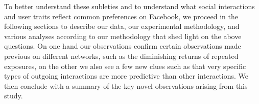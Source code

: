 To better understand these subleties and to understand what
social interactions and user traits reflect common preferences on
Facebook, we proceed in the following sections to describe our data,
our experimental methodology, and various analyses according to our
methodology that shed light on the above questions. 
On one hand our observations confirm certain observations made previous 
on different networks, such as the diminishing returns of repeated exposures, 
on the other we also see a few new clues such as 
that very specific types of outgoing interactions are more predictive 
than other interactions. 
We then conclude with a summary of the key novel observations arising
from this study.



